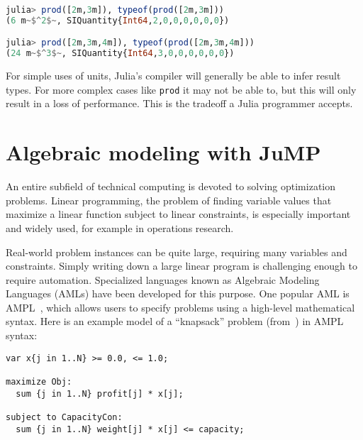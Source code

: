 \begin{singlespace}
\begin{lstlisting}[language=julia]
julia> prod([2m,3m]), typeof(prod([2m,3m]))
(6 m~$^2$~, SIQuantity{Int64,2,0,0,0,0,0,0})

julia> prod([2m,3m,4m]), typeof(prod([2m,3m,4m]))
(24 m~$^3$~, SIQuantity{Int64,3,0,0,0,0,0,0})
\end{lstlisting}
\end{singlespace}

\noindent
For simple uses of units, Julia's compiler will generally be able to
infer result types.
For more complex cases like \texttt{prod} it may not be able to, but
this will only result in a loss of performance.
This is the tradeoff a Julia programmer accepts.





\section{Algebraic modeling with JuMP}
\label{sec:jump}

An entire subfield of technical computing is devoted to solving optimization
problems.
Linear programming, the problem of finding variable values that maximize a
linear function subject to linear constraints, is especially important and
widely used, for example in operations research.

Real-world problem instances can be quite large, requiring many variables
and constraints.
Simply writing down a large linear program is challenging enough to
require automation.
Specialized languages known as Algebraic Modeling Languages (AMLs)
have been developed for this purpose.
One popular AML is AMPL~\cite{fourer1993ampl}, which allows users to
specify problems using a high-level mathematical syntax.
Here is an example model of a ``knapsack'' problem (from~\cite{LubinDunningIJOC})
in AMPL syntax:

\vspace{-3ex}
\begin{singlespace}
\begin{verbatim}
var x{j in 1..N} >= 0.0, <= 1.0;

maximize Obj:
  sum {j in 1..N} profit[j] * x[j];

subject to CapacityCon:
  sum {j in 1..N} weight[j] * x[j] <= capacity;
\end{verbatim}
\end{singlespace}

